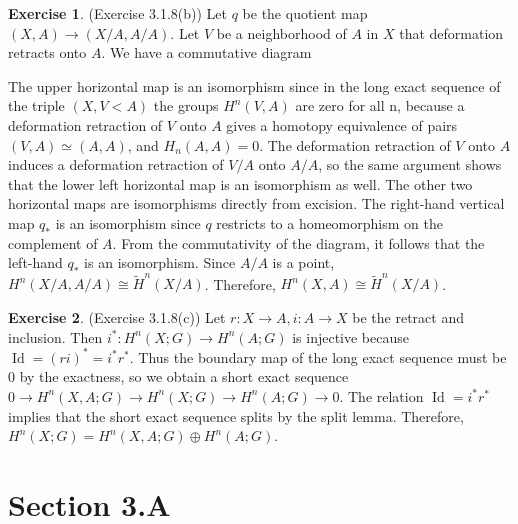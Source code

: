 \documentclass[12pt, psamsfonts]{amsart}
\theoremstyle{definition}
\newtheorem*{exer}{Exercise}
\theoremstyle{remark}
\DeclareMathOperator{\Id}{Id}
\numberwithin{equation}{section}
\begin{document}
\begin{exer}{(Exercise 3.1.8(b))}
  Let $q$ be the quotient map $(X, A) \rightarrow (X / A, A / A)$.
  Let $V$ be a neighborhood of $A$ in $X$ that deformation retracts onto $A$.
  We have a commutative diagram
  \begin{center}
  \end{center}
  The upper horizontal map is an isomorphism since in the long exact sequence of the triple $(X, V< A)$ the groups $H^n(V, A)$ are zero for all n, because a deformation retraction of $V$ onto $A$ gives a homotopy equivalence of pairs $(V, A) \simeq (A, A)$, and $H_n(A, A) = 0$.
  The deformation retraction of $V$ onto $A$ induces a deformation retraction of $V / A$ onto $A / A$, so the same argument shows that the lower left horizontal map is an isomorphism as well.
  The other two horizontal maps are isomorphisms directly from excision.
  The right-hand vertical map $q_{\ast}$ is an isomorphism since $q$ restricts to a homeomorphism on the complement of $A$.
  From the commutativity of the diagram, it follows that the left-hand $q_{\ast}$ is an isomorphism.
  Since $A / A$ is a point, $H^n(X / A, A / A) \cong \tilde{H}^n(X / A)$.
  Therefore, $H^n(X, A) \cong \tilde{H}^n(X / A)$.
\end{exer}

\begin{exer}{(Exercise 3.1.8(c))}
  Let $r: X \rightarrow A, i: A \rightarrow X$ be the retract and inclusion.
  Then $i^{\ast}: H^n(X; G) \rightarrow H^n(A; G)$ is injective because $\Id = (ri)^{\ast} = i^{\ast}r^{\ast}$.
  Thus the boundary map of the long exact sequence must be 0 by the exactness, so we obtain a short exact sequence $0 \rightarrow H^n(X, A; G) \rightarrow H^n(X; G) \rightarrow H^n(A; G) \rightarrow 0$.
  The relation $\Id = i^{\ast}r^{\ast}$ implies that the short exact sequence splits by the split lemma.
  Therefore, $H^n(X; G) = H^n(X, A; G) \oplus H^n(A; G)$.
\end{exer}

\section{Section 3.A}
\end{document}
